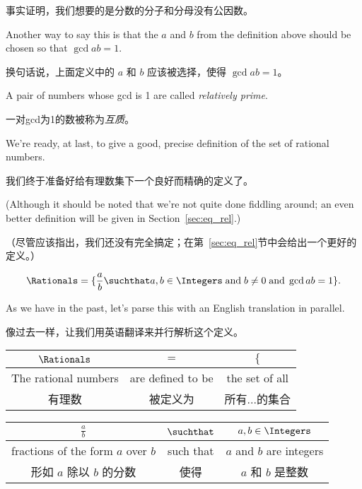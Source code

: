 事实证明，我们想要的是分数的分子和分母没有公因数。

Another way to
say this is that the $a$ and $b$ from the definition above should be
chosen so that $\gcd{a}{b} = 1$.

换句话说，上面定义中的 $a$ 和 $b$ 应该被选择，使得 $\gcd{a}{b} = 1$。

A pair of numbers whose gcd is 1 are
called  \emph{relatively prime}.

一对gcd为1的数被称为\emph{互质}。

We're ready, at last, to give a good, precise  definition of the set
of rational numbers.

我们终于准备好给有理数集下一个良好而精确的定义了。

(Although it should be noted that we're not
quite done fiddling around; an even better definition will be given in
Section~\ref{sec:eq_rel}.)  

（尽管应该指出，我们还没有完全搞定；在第~\ref{sec:eq_rel}节中会给出一个更好的定义。）

\[ \Rationals = \{ \frac{a}{b} \suchthat a,b \in \Integers \; \mbox{and} \;
b \neq 0 \; \mbox{and} \; \gcd{a}{b}=1 \}.
\]

As we have in the past, let's parse this with an English translation in parallel.

像过去一样，让我们用英语翻译来并行解析这个定义。

\vspace{.2in}

\begin{tabular}{c|c|c}
\rule[-10pt]{0pt}{22pt} $\Rationals$ & $=$ & $\{$  \\ \hline
\rule[-6pt]{0pt}{22pt} The rational numbers & are defined to be & the set of all\\
\rule[-6pt]{0pt}{22pt} 有理数 & 被定义为 & 所有...的集合\\
\end{tabular}

\vspace{.2in}

\begin{tabular}{c|c|c}
\rule[-10pt]{0pt}{22pt} $\displaystyle \frac{a}{b}$ & $\suchthat$ & $a,b \in \Integers$ \\ \hline
\rule[-6pt]{0pt}{22pt} fractions of the form $a$ over $b$ & such that
& $a$ and $b$ are integers \\
\rule[-6pt]{0pt}{22pt} 形如 $a$ 除以 $b$ 的分数 & 使得 & $a$ 和 $b$ 是整数 \\
\end{tabular}

